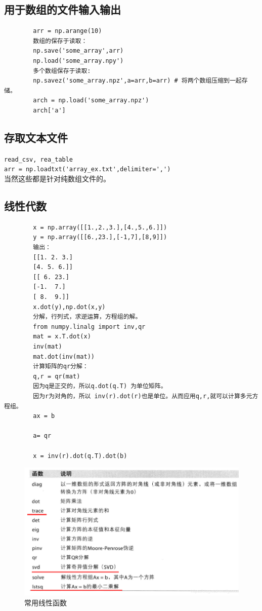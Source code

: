 \documentclass{article}
\begin{document}
	\subsection{用于数组的文件输入输出}
	\begin{lstlisting}
		arr = np.arange(10)
		数组的保存于读取：
		np.save('some_array',arr)
		np.load('some_array.npy')
		多个数组保存于读取:
		np.savez('some_array.npz',a=arr,b=arr) # 将两个数组压缩到一起存储。
		arch = np.load('some_array.npz')
		arch['a']
	\end{lstlisting}
	
	\subsection{存取文本文件}
	\noindent\verb|read_csv, rea_table|\\
	\verb|arr = np.loadtxt('array_ex.txt',delimiter=',')|\\
	当然这些都是针对纯数组文件的。
	
	\subsection{线性代数}
	\begin{lstlisting}
		x = np.array([[1.,2.,3.],[4.,5.,6.]])
		y = np.array([[6.,23.],[-1,7],[8,9]])
		输出：
		[[1. 2. 3.]
		[4. 5. 6.]]
		[[ 6. 23.]
		[-1.  7.]
		[ 8.  9.]]
		x.dot(y),np.dot(x,y)
		分解，行列式，求逆运算，方程组的解。
		from numpy.linalg import inv,qr
		mat = x.T.dot(x)
		inv(mat)
		mat.dot(inv(mat))
		计算矩阵的qr分解：
		q,r = qr(mat)
		因为q是正交的，所以q.dot(q.T) 为单位矩阵。
		因为r为对角的，所以 inv(r).dot(r)也是单位。从而应用q,r,就可以计算多元方程组。
		ax = b
		
		a= qr
		
		x = inv(r).dot(q.T).dot(b)
	\end{lstlisting}
	\begin{figure}[htbp]
		\centering
		\includegraphics[width=\linewidth]{fig/np_6}
		\caption{常用线性函数}
	\end{figure}
\end{document}
